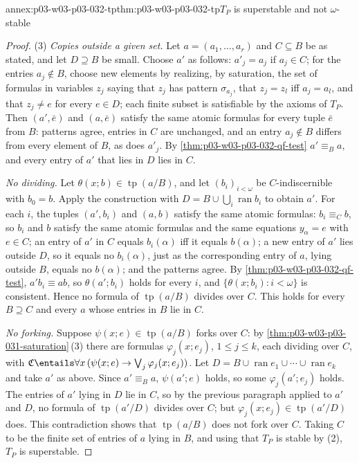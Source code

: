 \begin{annexitem}{annex:p03-w03-p03-032-tp}{thm:p03-w03-p03-032-tp}{\(T_P\) is superstable and not \(\omega\)-stable}
\begin{proof}
(3) \emph{Copies outside a given set.}  Let \(a=(a_1,\ldots,a_r)\) and
\(C\subseteq B\) be as stated, and let \(D\supseteq B\) be small.  Choose
\(a'\) as follows: \(a'_j=a_j\) if \(a_j\in C\); for the entries
\(a_j\notin B\), choose new elements by realizing, by saturation, the set of
formulas in variables \(z_j\) saying that \(z_j\) has pattern
\(\sigma_{a_j}\), that \(z_j=z_l\) iff \(a_j=a_l\), and that
\(z_j\neq e\) for every \(e\in D\); each finite subset is satisfiable by the
axioms of \(T_P\).  Then \((a',\bar e)\) and \((a,\bar e)\) satisfy the same
atomic formulas for every tuple \(\bar e\) from \(B\): patterns agree, entries
in \(C\) are unchanged, and an entry \(a_j\notin B\) differs from every
element of \(B\), as does \(a'_j\).  By \cref{thm:p03-w03-p03-032-qf-test}
\(a'\equiv_B a\), and every entry of \(a'\) that lies in \(D\) lies in \(C\).

\emph{No dividing.}  Let \(\theta(x;b)\in\operatorname{tp}(a/B)\), and let
\((b_i)_{i<\omega}\) be \(C\)-indiscernible with \(b_0=b\).  Apply the
construction with \(D=B\cup\bigcup_i\operatorname{ran}b_i\) to obtain
\(a'\).  For each \(i\), the tuples \((a',b_i)\) and \((a,b)\) satisfy the
same atomic formulas: \(b_i\equiv_C b\), so \(b_i\) and \(b\) satisfy the
same atomic formulas and the same equations \(y_\alpha=e\) with \(e\in C\);
an entry of \(a'\) in \(C\) equals \(b_i(\alpha)\) iff it equals
\(b(\alpha)\); a new entry of \(a'\) lies outside \(D\), so it equals no
\(b_i(\alpha)\), just as the corresponding entry of \(a\), lying outside
\(B\), equals no \(b(\alpha)\); and the patterns agree.  By
\cref{thm:p03-w03-p03-032-qf-test}, \(a'b_i\equiv ab\), so
\(\theta(a';b_i)\) holds for every \(i\), and
\(\{\theta(x;b_i):i<\omega\}\) is consistent.  Hence no formula of
\(\operatorname{tp}(a/B)\) divides over \(C\).  This holds for every
\(B\supseteq C\) and every \(a\) whose entries in \(B\) lie in \(C\).

\emph{No forking.}  Suppose \(\psi(x;e)\in\operatorname{tp}(a/B)\) forks over
\(C\): by \cref{thm:p03-w03-p03-031-saturation}\,(3) there are formulas
\(\varphi_j(x;e_j)\), \(1\leq j\leq k\), each dividing over \(C\), with
\(\mathfrak C\entails\forall x\,(\psi(x;e)\to\bigvee_j\varphi_j(x;e_j))\).
Let \(D=B\cup\operatorname{ran}e_1\cup\cdots\cup\operatorname{ran}e_k\) and
take \(a'\) as above.  Since \(a'\equiv_B a\), \(\psi(a';e)\) holds, so some
\(\varphi_j(a';e_j)\) holds.  The entries of \(a'\) lying in \(D\) lie in
\(C\), so by the previous paragraph applied to \(a'\) and \(D\), no formula of
\(\operatorname{tp}(a'/D)\) divides over \(C\); but
\(\varphi_j(x;e_j)\in\operatorname{tp}(a'/D)\) does.  This contradiction
shows that \(\operatorname{tp}(a/B)\) does not fork over \(C\).  Taking \(C\)
to be the finite set of entries of \(a\) lying in \(B\), and using that
\(T_P\) is stable by (2), \(T_P\) is superstable.
\end{proof}
\end{annexitem}

